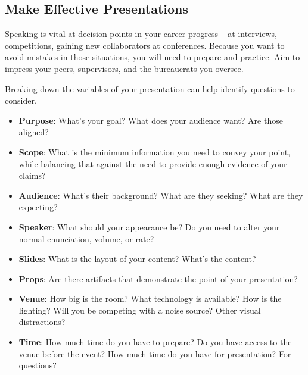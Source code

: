 \subsection*{Make Effective Presentations\label{sec:effective-presentations}}


Speaking is vital at decision points in your career progress -- at interviews, competitions, gaining new collaborators at conferences. 
Because you want to avoid mistakes in those situations, you will need to prepare and practice.
Aim to impress your peers, supervisors, and the bureaucrats you oversee. 

Breaking down the variables of your presentation can help identify questions to consider. 
\begin{itemize}
    \item \textbf{Purpose}: What's your goal? What does your audience want? Are those aligned? 
    \item \textbf{Scope}: What is the minimum information you need to convey your point, while balancing that against the need to provide enough evidence of your claims?
    \item \textbf{Audience}: What's their background? What are they seeking? What are they expecting?
    \item \textbf{Speaker}: What should your appearance be? Do you need to alter your normal enunciation, volume, or rate?
    \item \textbf{Slides}: What is the layout of your content? What's the content? 
    \item \textbf{Props}: Are there artifacts that demonstrate the point of your presentation?
    \item \textbf{Venue}: How big is the room? What technology is available? How is the lighting? Will you be competing with a noise source? Other visual distractions?
    \item \textbf{Time}: How much time do you have to prepare? Do you have access to the venue before the event? How much time do you have for presentation? For questions?
\end{itemize}

